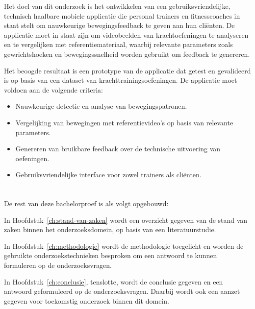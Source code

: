 Het doel van dit onderzoek is het ontwikkelen van een gebruiksvriendelijke, technisch haalbare mobiele applicatie die personal trainers en fitnesscoaches in staat stelt om nauwkeurige bewegingsfeedback te geven aan hun cliënten. De applicatie moet in staat zijn om videobeelden van krachtoefeningen te analyseren en te vergelijken met referentiemateriaal, waarbij relevante parameters zoals gewrichtshoeken en bewegingssnelheid worden gebruikt om feedback te genereren.

Het beoogde resultaat is een prototype van de applicatie dat getest en gevalideerd is op basis van een dataset van krachttrainingsoefeningen. De applicatie moet voldoen aan de volgende criteria:
\begin{itemize}
    \item Nauwkeurige detectie en analyse van bewegingspatronen.
    \item Vergelijking van bewegingen met referentievideo’s op basis van relevante parameters.
    \item Genereren van bruikbare feedback over de technische uitvoering van oefeningen.
    \item Gebruiksvriendelijke interface voor zowel trainers als cliënten.
\end{itemize}

\section{}%
\label{sec:opzet-bachelorproef}


De rest van deze bachelorproef is als volgt opgebouwd:

In Hoofdstuk~\ref{ch:stand-van-zaken} wordt een overzicht gegeven van de stand van zaken binnen het onderzoeksdomein, op basis van een literatuurstudie.

In Hoofdstuk~\ref{ch:methodologie} wordt de methodologie toegelicht en worden de gebruikte onderzoekstechnieken besproken om een antwoord te kunnen formuleren op de onderzoeksvragen.


In Hoofdstuk~\ref{ch:conclusie}, tenslotte, wordt de conclusie gegeven en een antwoord geformuleerd op de onderzoeksvragen. Daarbij wordt ook een aanzet gegeven voor toekomstig onderzoek binnen dit domein.